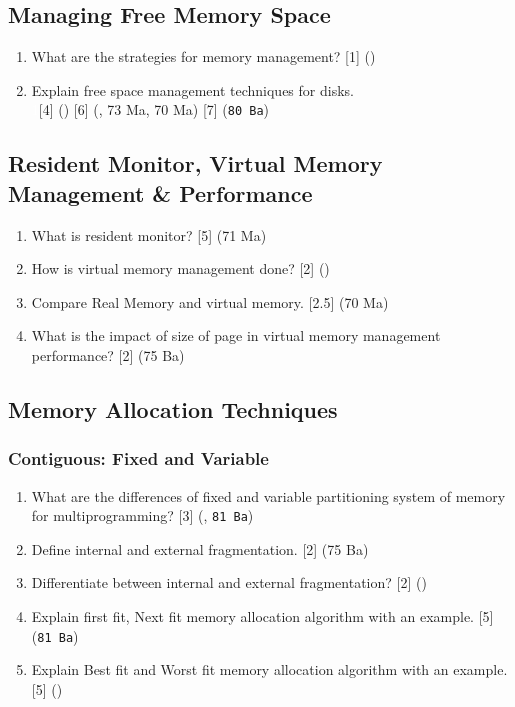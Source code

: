 \documentclass[12pt]{article}
\newcommand{\enter}{\\\textcolor{white}{1}}
\begin{document}
	\subsection{Managing Free Memory Space}
		\begin{enumerate}[noitemsep, topsep=0pt]
			\item What are the strategies for memory management? \hfill [1] ()
			
			\item Explain free space management techniques for disks.
			\enter\hfill [4] () [6] (, 73 Ma, 70 Ma) [7] (\texttt{80 Ba})
		\end{enumerate}

	\subsection{Resident Monitor, Virtual Memory Management \& Performance}
		\begin{enumerate}[noitemsep, topsep=0pt]
			\item What is resident monitor? \hfill [5] (71 Ma)
			
			\item How is virtual memory management done? \hfill [2] ()

			\item Compare Real Memory and virtual memory. \hfill [2.5] (70 Ma)

			\item What is the impact of size of page in virtual memory management performance? \hfill [2] (75 Ba)
		\end{enumerate}
	
	\subsection{Memory Allocation Techniques}
		\subsubsection{Contiguous: Fixed and Variable}
			\begin{enumerate}[noitemsep, topsep=0pt]
				\item What are the differences of fixed and variable partitioning system of memory for multiprogramming? \hspace{10.6cm} [3] (, \texttt{81 Ba})

				\item Define internal and external fragmentation. \hfill [2] (75 Ba)

				\item Differentiate between internal and external fragmentation? \hfill [2] ()
		
				\item Explain first fit, Next fit memory allocation algorithm with an example. \hfill [5] (\texttt{81 Ba})

				\item Explain Best fit and Worst fit memory allocation algorithm with an example. \hfill [5] ()
			\end{enumerate}
			
\end{document}

